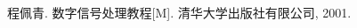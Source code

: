 \documentclass[12pt,a4paper]{article}
\begin{document}






\renewcommand\refname{参考文献}
\begin{thebibliography}{0}
%
程佩青. 数字信号处理教程[M]. 清华大学出版社有限公司, 2001.
%
%
\end{thebibliography}
\end{document}
